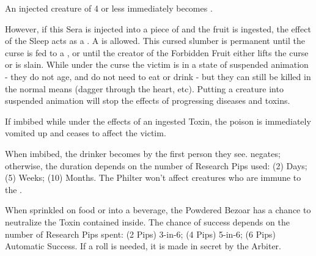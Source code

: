   \CHYMISTRY[
    Name=Grimm's Stuporous Preparation,
    Link=chymistry-grimms-stuporous-preparation,
    Type=Sera,
    Pips=5,
    Time=Weeks
  ]

  An injected creature of 4 \HD or less immediately becomes .

 However, if this Sera is injected into a piece of  and the fruit is ingested, the effect of the Sleep acts as a . A  is allowed. This cursed slumber is permanent until the curse is fed to a , or until the creator of the Forbidden Fruit either lifts the curse or is slain.  While under the curse the victim is in a state of suspended animation - they do not age, and do not need to eat or drink - but they can still be killed in the normal means (dagger through the heart, etc). Putting a creature into suspended animation will stop the effects of progressing diseases and toxins.


\CHYMISTRY[
  Name=Liebnitz Purgation,
  Link=chymistry-liebnitz-purgation,
  Type=Tonic,
  Pips=5,
  Time=Days
]


If imbibed while under the effects of an ingested Toxin, the poison is immediately vomited up and ceases to affect the victim.


\CHYMISTRY[
  Name=Philter of von Fuchs,
  Link=chymistry-philter-von-fuchs,
  Type=Tonic,
  Pips=2+,
  Time=Weeks
]

When imbibed, the drinker becomes  by the first person they see.  negates; otherwise, the duration depends on the number of Research Pips used:  (2) Days; (5) Weeks; (10) Months. The Philter won't affect creatures who are immune to the .


  \CHYMISTRY[
    Name=Powdered Bezoar,
    Link=chymistry-powdered-bezoar,
    Type=Powder,
    Pips=2+,
    Time=Days
  ]


  When sprinkled on food or into a beverage, the Powdered Bezoar has a chance to neutralize the Toxin contained inside. The chance of success depends on the number of Research Pips spent: (2 Pips) 3-in-6; (4 Pips) 5-in-6; (6 Pips) Automatic Success. If a roll is needed, it is made in secret by the Arbiter.



  \CHYMISTRY[
    Name=Tesla's Silver Wash,
    Link=chymistry-teslas-silver-wash,
    Type=Unguent,
    Pips=5,
    Time=Weeks
  ]

